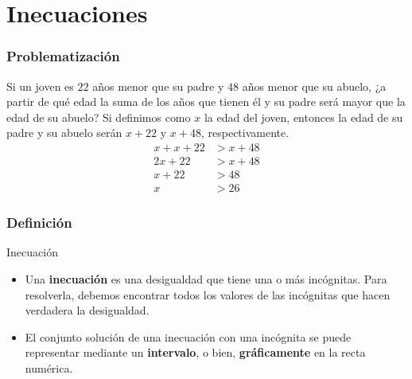 \documentclass[12pt,spanish,x11names]{beamer}
\title{\talktitle}
\subtitle{\talksubtitle}
\author{\talkauthor}
\institute{\talkaffiliation}
\date{\footnotesize{\emph{\href{\talkblog}{\talkemail}}}}
\begin{document}
\begin{frame}
\titlepage
\end{frame}
\section{Inecuaciones}
\begin{frame}
  \frametitle{Problematización}
  \begin{exampleblock}{Si un joven es $22$ años menor que su padre y $48$ años menor que su abuelo,
¿a partir de qué edad la suma de los años que tienen él y su padre será mayor
que la edad de su abuelo?}
\pause
    Si definimos como $x$ la edad del joven, entonces la edad de su padre y su abuelo
    serán $x+22$ y $x+48$, respectivamente.
    \begin{align*}
      x+x+22&>x+48\\
      2x+22&>x+48\\
      x+22&>48\\
      x&>26
    \end{align*}
  \end{exampleblock}
\end{frame}
\begin{frame}
  \frametitle{Definición}
  \begin{block}{Inecuación}
    \begin{itemize}
    \item Una \textbf{inecuación} es una \alert{desigualdad} que tiene una o más incógnitas. Para
    resolverla, debemos encontrar todos los valores de las incógnitas que hacen
    verdadera la desigualdad.
    \item El conjunto solución de una inecuación con una incógnita se puede
    representar mediante un \textbf{intervalo}, o bien, \textbf{gráficamente} en la recta numérica.
    \end{itemize}
  \end{block}
\end{frame}
\end{document}
